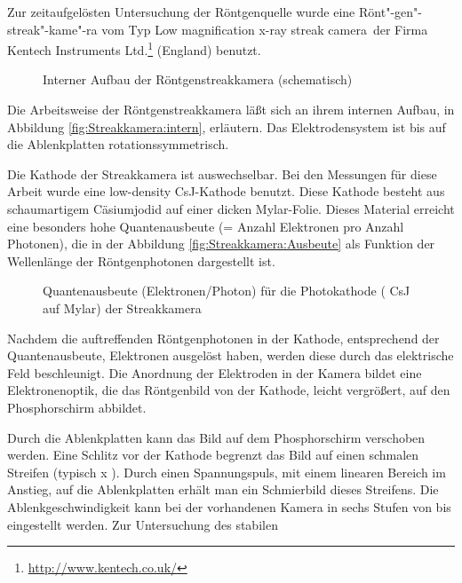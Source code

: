 \label{sec:streakkamera}
%
Zur zeitaufgelösten Untersuchung der Röntgenquelle wurde eine
Rönt"-gen"-streak"-kame"-ra vom Typ \glqq Low magnification x-ray
streak camera\grqq\ der Firma Kentech Instruments
Ltd.\footnote{\url{http://www.kentech.co.uk/}} (England) benutzt.
%
\par
\begin{figure}[H]
  \center
  \caption{Interner Aufbau der Röntgenstreakkamera (schematisch) \cite{kentech:93}}
  \label{fig:Streakkamera:intern}
\end{figure}
%
\par
Die Arbeitsweise der Röntgenstreakkamera läßt sich an ihrem internen
Aufbau, in Abbildung \vref{fig:Streakkamera:intern}, erläutern. Das
Elektrodensystem ist bis auf die Ablenkplatten rotationssymmetrisch.
\par
Die Kathode der Streakkamera ist auswechselbar. Bei den Messungen für
diese Arbeit wurde eine low-density CsJ-Kathode benutzt. Diese Kathode
besteht aus schaumartigem Cäsiumjodid auf einer  dicken
Mylar-Folie. Dieses Material erreicht eine besonders hohe
Quantenausbeute (= Anzahl Elektronen pro Anzahl Photonen), die in der
Abbildung \vref{fig:Streakkamera:Ausbeute} als Funktion der Wellenlänge
der Röntgenphotonen dargestellt ist.
%
\par
\begin{figure}[H]
  \center
  \caption{Quantenausbeute (Elektronen/Photon) für die Photokathode
     ( CsJ auf  Mylar) der Streakkamera
     \cite{roewe:phd}}
  \label{fig:Streakkamera:Ausbeute}
\end{figure}
%
\par
Nachdem die auftreffenden Röntgenphotonen in der Kathode, entsprechend
der Quantenausbeute, Elektronen ausgelöst haben, werden diese durch das
elektrische Feld beschleunigt. Die Anordnung der Elektroden in der
Kamera bildet eine Elektronenoptik, die das Röntgenbild von der
Kathode, leicht vergrößert, auf den Phosphorschirm abbildet.
\par
Durch die Ablenkplatten kann das Bild auf dem Phosphorschirm
verschoben werden. Eine Schlitz vor der Kathode begrenzt das Bild
auf einen schmalen Streifen (typisch  x
). Durch einen Spannungspuls, mit einem linearen
Bereich im Anstieg, auf die Ablenkplatten erhält man ein
Schmierbild dieses Streifens. Die Ablenkgeschwindigkeit kann bei
der vorhandenen Kamera in sechs Stufen von  bis
 eingestellt werden. Zur Untersuchung des stabilen
